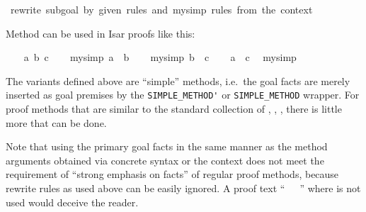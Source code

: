 \begin{isabellebody}
{}\ {}rewrite\ subgoal\ by\ given\ rules\ and\ my{}simp\ rules\ from\ the\ context{}%
\endisatagML
{\isafoldML}%
%
\isadelimML
%
\endisadelimML
%
\begin{isamarkuptext}%
\medskip Method \hyperlink{method.my-simp'}{\mbox{}} can be used in Isar proofs
  like this:%
\end{isamarkuptext}%
\isamarkuptrue%
\isamarkupfalse%
\isanewline
%
\isadelimproof
\ \ %
\endisadelimproof
%
\isatagproof
{}\isamarkupfalse%
\ a\ b\ c\isanewline
\ \ \isamarkupfalse%
\ {}my{}simp{}{}\ {}a\ {}\ b{}\isanewline
\ \ \isamarkupfalse%
\ {}my{}simp{}{}\ {}b\ {}\ c{}\isanewline
\ \ \isamarkupfalse%
\ {}a\ {}\ c{}\ \isamarkupfalse%
\ my{}simp{}\isanewline
{}\isamarkupfalse%
%
\endisatagproof
{\isafoldproof}%
%
\isadelimproof
%
\endisadelimproof
%
\begin{isamarkuptext}%
\medskip The \hyperlink{method.my-simp}{\mbox{}} variants defined above are
  ``simple'' methods, i.e.\ the goal facts are merely inserted as goal
  premises by the \verb|SIMPLE_METHOD'| or \verb|SIMPLE_METHOD| wrapper.
  For proof methods that are similar to the standard collection of
  \hyperlink{method.simp}{\mbox{}}, \hyperlink{method.blast}{\mbox{}}, \hyperlink{method.fast}{\mbox{}}, \hyperlink{method.auto}{\mbox{}}
  there is little more that can be done.

  Note that using the primary goal facts in the same manner as the
  method arguments obtained via concrete syntax or the context does
  not meet the requirement of ``strong emphasis on facts'' of regular
  proof methods, because rewrite rules as used above can be easily
  ignored.  A proof text ``\hyperlink{command.using}{\mbox{}}~~\hyperlink{command.by}{\mbox{}}~'' where  is not used would
  deceive the reader.


\end{isamarkuptext}
\end{isabellebody}
